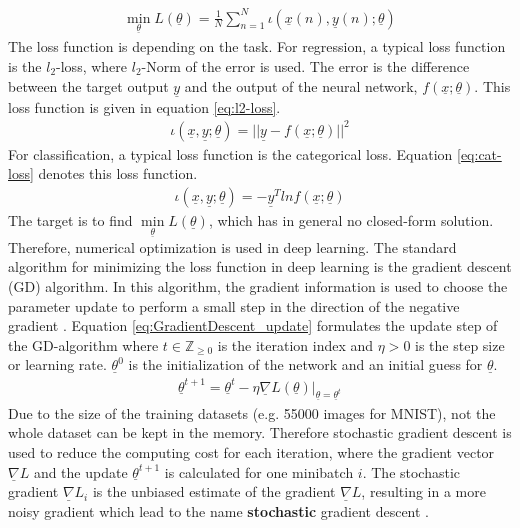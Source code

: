 \documentclass[12pt,DIV14,BCOR12mm,a4paper,footexclude,headinclude,halfparskip-,twoside,openright,cleardoubleempty,idxtotoc,bibtotoc,listtotoc,abstracton]{scrreprt} %
\numberwithin{equation}{chapter}
\begin{document}
\begin{align}
	\underset{\underline{\theta}}\min L(\underline{\theta}) = \frac{1}{N}\sum_{n=1}^{N}\iota(\underline{x}(n),\underline{y}(n);\underline{\theta})  \label{eq:CostFunction}
\end{align}
The loss function is depending on the task. For regression, a typical loss function is the $l_{2}$-loss, where $l_{2}$-Norm of the error is used. The error is the difference between the target output $\underline{y}$ and the output of the neural network, $f(\underline{x};\underline{\theta})$. This loss function is given in equation \ref{eq:l2-loss}.
\begin{align}
	\iota(\underline{x},\underline{y};\underline{\theta}) = ||\underline{y}-f(\underline{x};\underline{\theta})||^{2}\label{eq:l2-loss}
\end{align}
For classification, a typical loss function is the categorical loss. Equation \ref{eq:cat-loss} denotes this loss function.
\begin{align}
	\iota(\underline{x},\underline{y};\underline{\theta}) = -\underline{y}^{T}ln f(\underline{x};\underline{\theta})\label{eq:cat-loss}
\end{align}
The target is to find $\underset{\underline{\theta}}\min L(\underline{\theta})$, which has in general no closed-form solution. Therefore, numerical optimization is used in deep learning. The standard algorithm for minimizing the loss function in deep learning is the gradient descent (GD) algorithm. In this algorithm, the gradient information is used to choose the parameter update to perform a small step in the direction of the negative gradient \cite{Bishop}. Equation \ref{eq:GradientDescent_update} formulates the update step of the GD-algorithm where $t \in \mathbb{Z}_{\geq0}$ is the iteration index and $\eta > 0$ is the step size or learning rate. $\underline{\theta}^{0}$ is the initialization of the network and an initial guess for $\underline{\theta}$.
\begin{align}
	\underline{\theta}^{t+1} = \underline{\theta}^{t} - \eta\underline{\nabla}L(\underline{\theta})|_{\underline{\theta}=\underline{\theta}^{t}}\label{eq:GradientDescent_update}
\end{align}
Due to the size of the training datasets (e.g. 55000 images for MNIST), not the whole dataset can be kept in the memory. Therefore stochastic gradient descent is used to reduce the computing cost for each iteration, where the gradient vector $\underline{\nabla}L$ and the update $\underline{\theta}^{t+1}$ is calculated for one minibatch $i$. The stochastic gradient $\underline{\nabla}L_{i}$ is the unbiased estimate of the gradient $\underline{\nabla}L$, resulting in a more noisy gradient which lead to the name \textbf{stochastic} gradient descent \cite{DeepLearningDive}.\\
\end{document}
